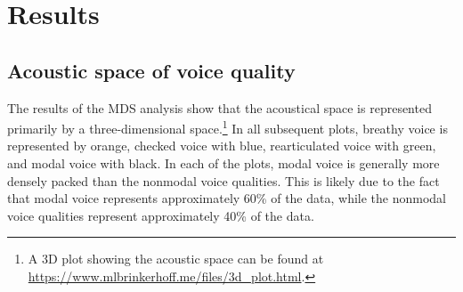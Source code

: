 
\section{Results} \label{sec:acousticlandscape:results}
\subsection{Acoustic space of voice quality} \label{sec:acousticlandscape:space}

The results of the MDS analysis show that the acoustical space is represented primarily by a three-dimensional space.\footnote{A 3D plot showing the acoustic space can be found at \href{https://www.mlbrinkerhoff.me/files/3d_plot.html}{https://www.mlbrinkerhoff.me/files/3d_plot.html}.} In all subsequent plots, breathy voice is represented by orange, checked voice with blue, rearticulated voice with green, and modal voice with black. In each of the plots, modal voice is generally more densely packed than the nonmodal voice qualities. This is likely due to the fact that modal voice represents approximately 60\% of the data, while the nonmodal voice qualities represent approximately 40\% of the data. 


